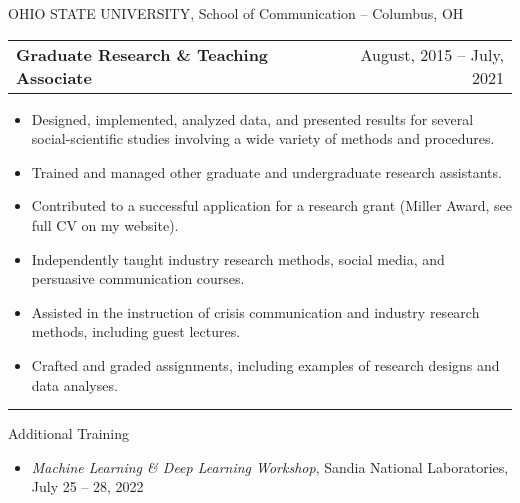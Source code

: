 \documentclass[letterpaper, 9pt]{extarticle}
\begin{document}
{OHIO STATE UNIVERSITY, School of Communication -- Columbus, OH
\begin{tabularx}{\textwidth}{Xr}
\textbf{Graduate Research \& Teaching Associate} & August, 2015 -- July, 2021
\end{tabularx}

\vspace{-4pt}
\begin{itemize}[leftmargin=!,labelindent=5pt,itemindent=0pt]
\item  Designed, implemented, analyzed data, and presented results for several social-scientific studies involving a wide variety of methods and procedures.

\vspace{-6pt}
\item  Trained and managed other graduate and undergraduate research assistants.

\vspace{-6pt}
\item  Contributed to a successful application for a research grant (Miller Award, see full CV on my website).

\vspace{-6pt}
\item  Independently taught industry research methods, social media, and persuasive communication courses.

\vspace{-6pt}
\item  Assisted in the instruction of crisis communication and industry research methods, including guest lectures.

\vspace{-6pt}
\item  Crafted and graded assignments, including examples of research designs and data analyses.
\end{itemize}

\vspace{-7.5pt}

\rule{\textwidth}{0.25pt}
\raggedright

\vspace{-4pt}
\begin{center}
\large{Additional Training}
\end{center}

\begin{itemize}[leftmargin=!,labelindent=-10pt,itemindent=0pt]
\item \textit{Machine Learning \& Deep Learning Workshop}, Sandia National Laboratories, July 25 -- 28, 2022


\end{itemize}}
\end{document}
